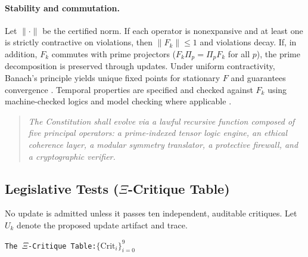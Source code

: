 \documentclass[12pt]{amsart}
\theoremstyle{plain}
\begin{document}
\paragraph{Stability and commutation.}
Let $\|\cdot\|$ be the certified norm. If each operator is nonexpansive and at least one is strictly contractive on violations, then $\|F_k\|\le1$ and violations decay. If, in addition, $F_k$ commutes with prime projectors ($F_k\Pi_p=\Pi_pF_k$ for all $p$), the prime decomposition is preserved through updates. Under uniform contractivity, Banach's principle yields unique fixed points for stationary $F$ and guarantees convergence \cite{granas2003fixed}. Temporal properties are specified and checked against $F_k$ using machine-checked logics and model checking where applicable \cite{lamport2002specifying,clarke1999model}.

\begin{quote}
\textit{The Constitution shall evolve via a lawful recursive function composed of five principal operators: a prime-indexed tensor logic engine, an ethical coherence layer, a modular symmetry translator, a protective firewall, and a cryptographic verifier.}
\end{quote}

\subsection{Legislative Tests (\texorpdfstring{$\Xi$}{Xi}-Critique Table)}

No update is admitted unless it passes ten independent, auditable critiques. Let $U_k$ denote the proposed update artifact and trace.

\begin{center}
\texttt{The $\Xi$-Critique Table:}\quad $\{\mathrm{Crit}_i\}_{i=0}^{9}$
\end{center}
\end{document}
